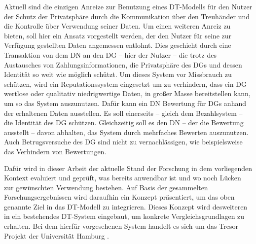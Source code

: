\documentclass[
	fontsize=11pt,
	headings=small,
	parskip=half,           %
	bibliography=totoc,
	numbers=noenddot,       %
	open=any,               %
]{scrreprt}
\begin{document}
Aktuell sind die einzigen Anreize zur Benutzung eines DT-Modells für den Nutzer der Schutz der Privatsphäre durch die Kommunikation über den Treuhänder und die Kontrolle über Verwendung seiner Daten. Um einen weiteren Anreiz zu bieten, soll hier ein Ansatz vorgestellt werden, der den Nutzer für seine zur Verfügung gestellten Daten angemessen entlohnt. Dies geschieht durch eine Transaktion von dem DN an den DG -- hier der Nutzer -- die trotz des Austausches von Zahlungsinformationen, die Privatsphäre des DGs und dessen Identität so weit wie möglich schützt. Um dieses System vor Missbrauch zu schützen, wird ein Reputationssystem eingesetzt um zu verhindern, dass ein DG wertlose oder qualitativ niedrigwertige Daten, in großer Masse bereitstellen kann, um so das System auszunutzen. Dafür kann ein DN Bewertung für DGs anhand der erhaltenen Daten ausstellen. Es soll einerseits -- gleich dem Bezahlsystem -- die Identität des DG schützen. Gleichzeitig soll es den DN -- der die Bewertung ausstellt -- davon abhalten, das System durch mehrfaches Bewerten auszunutzen. Auch Betrugsversuche des DG sind nicht zu vernachlässigen, wie beispielsweise das Verhindern von Bewertungen.

Dafür wird in dieser Arbeit der aktuelle Stand der Forschung in dem vorliegenden Kontext evaluiert und geprüft, was bereits anwendbar ist und wo noch Lücken zur gewünschten Verwendung bestehen. Auf Basis der gesammelten Forschungsergebnissen wird daraufhin ein Konzept präsentiert, um das oben genannte Ziel in das DT-Modell zu integrieren. Dieses Konzept wird desweiteren in ein bestehendes DT-System eingebaut, um konkrete Vergleichsgrundlagen zu erhalten. Bei dem hierfür vorgesehenen System handelt es sich um das Tresor-Projekt der Universität Hamburg \cite{TRESOR}.


\end{document}
